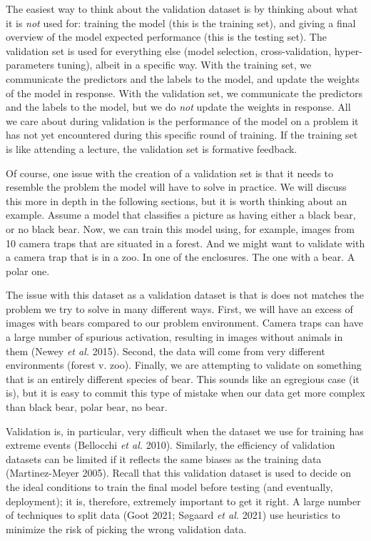 \documentclass[
  letterpaper,
]{scrbook}
\begin{document}
The easiest way to think about the validation dataset is by thinking
about what it is \emph{not} used for: training the model (this is the
training set), and giving a final overview of the model expected
performance (this is the testing set). The validation set is used for
everything else (model selection, cross-validation, hyper-parameters
tuning), albeit in a specific way. With the training set, we communicate
the predictors and the labels to the model, and update the weights of
the model in response. With the validation set, we communicate the
predictors and the labels to the model, but we do \emph{not} update the
weights in response. All we care about during validation is the
performance of the model on a problem it has not yet encountered during
this specific round of training. If the training set is like attending a
lecture, the validation set is formative feedback.

Of course, one issue with the creation of a validation set is that it
needs to resemble the problem the model will have to solve in practice.
We will discuss this more in depth in the following sections, but it is
worth thinking about an example. Assume a model that classifies a
picture as having either a black bear, or no black bear. Now, we can
train this model using, for example, images from 10 camera traps that
are situated in a forest. And we might want to validate with a camera
trap that is in a zoo. In one of the enclosures. The one with a bear. A
polar one.

The issue with this dataset as a validation dataset is that is does not
matches the problem we try to solve in many different ways. First, we
will have an excess of images with bears compared to our problem
environment. Camera traps can have a large number of spurious
activation, resulting in images without animals in them (Newey \emph{et
al.} 2015). Second, the data will come from very different environments
(forest v. zoo). Finally, we are attempting to validate on something
that is an entirely different species of bear. This sounds like an
egregious case (it is), but it is easy to commit this type of mistake
when our data get more complex than black bear, polar bear, no bear.

Validation is, in particular, very difficult when the dataset we use for
training has extreme events (Bellocchi \emph{et al.} 2010). Similarly,
the efficiency of validation datasets can be limited if it reflects the
same biases as the training data (Martinez-Meyer 2005). Recall that this
validation dataset is used to decide on the ideal conditions to train
the final model before testing (and eventually, deployment); it is,
therefore, extremely important to get it right. A large number of
techniques to split data (Goot 2021; Søgaard \emph{et al.} 2021) use
heuristics to minimize the risk of picking the wrong validation data.
\end{document}
